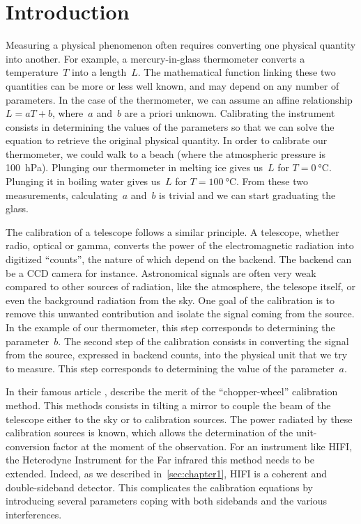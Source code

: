 
\section{Introduction}

Measuring a physical phenomenon often requires converting one physical quantity into another.
For example, a mercury-in-glass thermometer converts a temperature~$T$ into a length~$L$.
The mathematical function linking these two quantities can be more or less well known, and may depend on any number of parameters.
In the case of the thermometer, we can assume an affine relationship $L = aT+b$, where~$a$ and~$b$ are a priori unknown.
Calibrating the instrument consists in determining the values of the parameters so that we can solve the equation to retrieve the original physical quantity.
In order to calibrate our thermometer, we could walk to a beach (where the atmospheric pressure is \SI{100}{\hecto\pascal}).
Plunging our thermometer in melting ice gives us~$L$ for $T=\SI{0}{\degreeCelsius}$.
Plunging it in boiling water gives us~$L$ for $T=\SI{100}{\degreeCelsius}$.
From these two measurements, calculating~$a$ and~$b$ is trivial and we can start graduating the glass.

The calibration of a telescope follows a similar principle.
A telescope, whether radio, optical or gamma, converts the power of the electromagnetic radiation into digitized ``counts'', the nature of which depend on the backend.
The backend can be a CCD camera for instance.
Astronomical signals are often very weak compared to other sources of radiation, like the atmosphere, the telesope itself, or even the background radiation from the sky.
One goal of the calibration is to remove this unwanted contribution and isolate the signal coming from the source.
In the example of our thermometer, this step corresponds to determining the parameter~$b$.
The second step of the calibration consists in converting the signal from the source, expressed in backend counts, into the physical unit that we try to measure.
This step corresponds to determining the value of the parameter~$a$.

In their famous article  \cite{ulich1976absolute}, \citeauthor{ulich1976absolute} describe the merit of the ``chopper-wheel'' calibration method.
This methods consists in tilting a mirror to couple the beam of the telescope either to the sky or to calibration sources.
The power radiated by these calibration sources is known, which allows the determination of the unit-conversion factor at the moment of the observation.
For an instrument like HIFI, the Heterodyne Instrument for the Far infrared this method needs to be extended.
Indeed, as we described in~\cref{sec:chapter1}, HIFI is a coherent and double-sideband detector.
This complicates the calibration equations by introducing several parameters coping with both sidebands and the various interferences.

